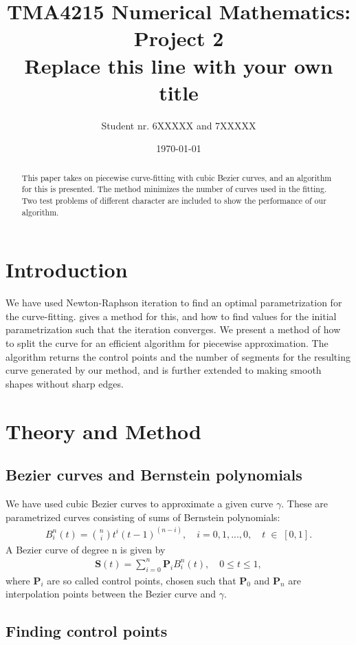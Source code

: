 \documentclass[10pt]{article}
\title{TMA4215 Numerical Mathematics: Project 2 \\ Replace this line with your own title}
\author{Student nr. 6XXXXX and 7XXXXX} %
\date{\today}
\begin{document}
\maketitle
\begin{abstract}
This paper takes on piecewise curve-fitting with cubic Bezier curves, and an algorithm for this is presented. The method minimizes the number of curves used in the fitting. Two test problems of different character are included to show the performance of our algorithm.
\end{abstract}

\section*{Introduction} 
We have used Newton-Raphson iteration to find an optimal parametrization for the curve-fitting. \cite{Plass:1983} gives a method for this, and how to find values for the initial parametrization such that the iteration converges. We present a method of how to split the curve for an efficient algorithm for piecewise approximation. The algorithm returns the control points and the number of segments for the resulting curve generated by our method, and is further extended to making smooth shapes without sharp edges.


\section*{Theory and Method}

\subsection*{Bezier curves and Bernstein polynomials}

We have used cubic Bezier curves to approximate a given curve $\gamma$. These are parametrized curves consisting of sums of Bernstein polynomials:
\begin{align}
B_{i}^n(t) = \binom{n}{i}t^i(t-1)^{(n-i)},\quad i = 0, 1, ..., 0,\quad t \; \in \; [0,1].
\end{align}
A Bezier curve of degree n is given by
\begin{align}
\mathbf{S}(t) = \sum_{i=0}^{n} \mathbf{P}_i B_{i}^n(t), \quad 0 \leq t \leq 1,
\end{align}
where $\mathbf{P}_i$ are so called control points, chosen such that $\mathbf{P}_0$ and $\mathbf{P}_n$ are interpolation points between the Bezier curve and $\gamma$.


\subsection*{Finding control points}
\end{document}
